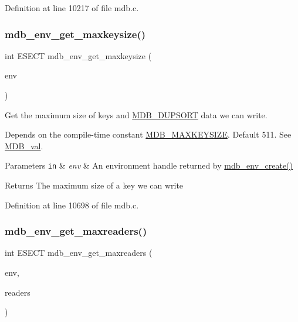 Definition at line 10217 of file mdb.\+c.

\mbox{\label{group__internal_gad88d25c67bcf8299aa339b7bd74831a6}} 
\subsubsection{\texorpdfstring{mdb\+\_\+env\+\_\+get\+\_\+maxkeysize()}{mdb\_env\_get\_maxkeysize()}}
{\footnotesize\ttfamily int E\+S\+E\+CT mdb\+\_\+env\+\_\+get\+\_\+maxkeysize (\begin{DoxyParamCaption}\item[{\mbox{\hyperlink{struct_m_d_b__env}{M\+D\+B\+\_\+env}} $\ast$}]{env }\end{DoxyParamCaption})}



Get the maximum size of keys and \mbox{\hyperlink{group__mdb__dbi__open_gae0626566c2562e9007f5c8c9535bab1a}{M\+D\+B\+\_\+\+D\+U\+P\+S\+O\+RT}} data we can write. 

Depends on the compile-\/time constant \mbox{\hyperlink{group__internal_gac929399f5d93cef85f874b9e9b1d09e0}{M\+D\+B\+\_\+\+M\+A\+X\+K\+E\+Y\+S\+I\+ZE}}. Default 511. See \mbox{\hyperlink{struct_m_d_b__val}{M\+D\+B\+\_\+val}}. 
\begin{DoxyParams}[1]{Parameters}
\mbox{\tt in}  & {\em env} & An environment handle returned by \mbox{\hyperlink{group__mdb_gaad6be3d8dcd4ea01f8df436f41d158d4}{mdb\+\_\+env\+\_\+create()}} \\
\hline
\end{DoxyParams}
\begin{DoxyReturn}{Returns}
The maximum size of a key we can write 
\end{DoxyReturn}


Definition at line 10698 of file mdb.\+c.

\mbox{\label{group__internal_ga70ae94521f18d85d39e3a354267ac489}} 
\subsubsection{\texorpdfstring{mdb\+\_\+env\+\_\+get\+\_\+maxreaders()}{mdb\_env\_get\_maxreaders()}}
{\footnotesize\ttfamily int E\+S\+E\+CT mdb\+\_\+env\+\_\+get\+\_\+maxreaders (\begin{DoxyParamCaption}\item[{\mbox{\hyperlink{struct_m_d_b__env}{M\+D\+B\+\_\+env}} $\ast$}]{env,  }\item[{unsigned int $\ast$}]{readers }\end{DoxyParamCaption})}



